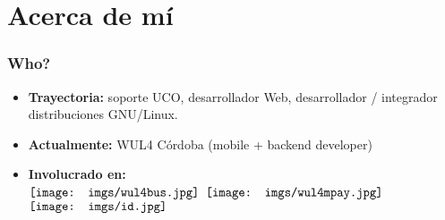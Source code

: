 \section{Acerca de mí}
\frame
{
\frametitle{Who?}
\begin{itemize}
\item \textbf{Trayectoria:} soporte UCO, desarrollador Web, desarrollador / integrador distribuciones GNU/Linux.
\item \textbf{Actualmente:} WUL4 Córdoba (mobile + backend developer)
\item \textbf{Involucrado en:} \\ \vspace{10pt}
  $\vcenter{\hbox{\texttt{[image: imgs/wul4bus.jpg]}}}$
  $\vcenter{\hbox{\texttt{[image: imgs/wul4mpay.jpg]}}}$
  $\vcenter{\hbox{\texttt{[image: imgs/id.jpg]}}}$
\end{itemize}
}
